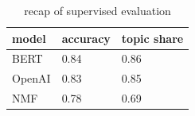 \begin{table}[]
\centering
\begin{tabular}{|l|ll|}
\hline
model  & accuracy & topic share \\ \hline
BERT   & 0.84     & 0.86        \\
OpenAI & 0.83     & 0.85        \\
NMF    & 0.78     & 0.69        \\ \hline
\end{tabular}
\caption{recap of supervised evaluation}
\label{tab:supervised recap }
\end{table}


